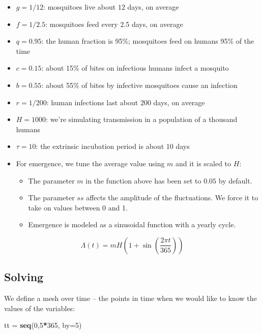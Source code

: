 \documentclass[
]{book}
\newenvironment{Shaded}{\begin{snugshade}}{\end{snugshade}}
\newcommand{\AttributeTok}[1]{\textcolor[rgb]{0.13,0.29,0.53}{#1}}
\newcommand{\DecValTok}[1]{\textcolor[rgb]{0.00,0.00,0.81}{#1}}
\newcommand{\FunctionTok}[1]{\textcolor[rgb]{0.13,0.29,0.53}{\textbf{#1}}}
\newcommand{\NormalTok}[1]{#1}
\newcommand{\OtherTok}[1]{\textcolor[rgb]{0.56,0.35,0.01}{#1}}
\newcommand{\SpecialCharTok}[1]{\textcolor[rgb]{0.81,0.36,0.00}{\textbf{#1}}}
\begin{document}
\begin{itemize}
\item
  \(g=1/12\): mosquitoes live about \(12\) days, on average
\item
  \(f=1/2.5\): mosquitoes feed every 2.5 days, on average
\item
  \(q=0.95\): the human fraction is 95\%; mosquitoes feed on humans 95\% of the time
\item
  \(c=0.15\): about 15\% of bites on infectious humans infect a mosquito
\item
  \(b=0.55\): about 55\% of bites by infective mosquitoes cause an infection
\item
  \(r=1/200\): human infections last about \(200\) days, on average
\item
  \(H=1000\): we're simulating transmission in a population of a thousand humans
\item
  \(\tau=10\): the extrinsic incubation period is about 10 days
\item
  For emergence, we tune the average value using \(m\) and it is scaled to \(H\):

  \begin{itemize}
  \item
    The parameter \(m\) in the function above has been set to \(0.05\) by default.
  \item
    The parameter \(ss\) affects the amplitude of the fluctuations. We force it to take on values between 0 and 1.
  \item
    Emergence is modeled as a sinusoidal function with a yearly cycle.
  \end{itemize}
\end{itemize}

\[\Lambda(t) = m H \left(1 + \sin \left(\frac{2\pi t}{365}\right)\right)\]

\hypertarget{solving}{%
\subsection{Solving}\label{solving}}

We define a mesh over time -- the points in time when we would like to know the values of the variables:

\begin{Shaded}
\begin{Highlighting}[]
\NormalTok{tt }\OtherTok{=} \FunctionTok{seq}\NormalTok{(}\DecValTok{0}\NormalTok{,}\DecValTok{5}\SpecialCharTok{*}\DecValTok{365}\NormalTok{, }\AttributeTok{by=}\DecValTok{5}\NormalTok{) }
\end{Highlighting}
\end{Shaded}
\end{document}

